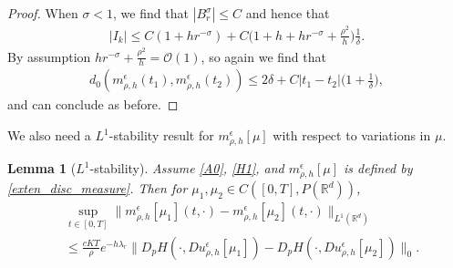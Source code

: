 \documentclass[a4paper,  twoside, 10pt, leqno]{amsart}
\newcommand{\R}{\mathbb{R}}
\newcommand{\rd}{\mathbb{R}^d}
\newtheorem{lemma}[thm]{Lemma}
\theoremstyle{remark}
\theoremstyle{definition}
\begin{document}
\begin{proof}
When $\sigma<1$, we find that $|B_r^{\sigma}|\leq C$ and hence that
\begin{align*} 
|I_k| \leq  C(1+h r ^{-\sigma} )  + C\big( 1 + h   +h r ^{-\sigma} + \frac{\rho^2}{h}\big) \frac{1}{\delta}.
\end{align*}
By assumption $h r^{-\sigma}+ \frac{\rho^2}{h}= \mathcal{O}(1)$, so again we find that
\begin{align*}
d_0(m^{\epsilon}_{\rho,h}(t_1),m^{\epsilon}_{\rho,h}(t_2)) \leq 2\delta + C |t_1-t_2|\Big(1+\frac{1}{\delta}\Big), 
\end{align*}
and can conclude as before.
\end{proof} 

We also need a $L^1$-stability result for $m^{\epsilon}_{\rho,h}[\mu]$ with respect to variations in $\mu$.

\begin{lemma}[$L^{1}$-stability] \label{L1_stability_fp}
Assume \ref{A0}, \ref{H1}, and $m^{\epsilon}_{\rho,h}[\mu]$ is defined by \eqref{exten_disc_measure}.
    Then for $\mu_1,\mu_2 \in C([0,T],P(\rd))$,
    \begin{align*}
      &  \sup_{t \in  [ 0,T ]} \| m^{\epsilon}_{\rho,h}[\mu_1] ( t, \cdot ) - m^{\epsilon}_{\rho,h}[\mu_2] ( t,\cdot )   \|_{L^{1} ( \R^d )}  \\
        &\leq \frac{cKT}{\rho} e^{- h \lambda_{r}} \big\| D_p H(\cdot, Du^{\epsilon}_{\rho,h}[\mu_1]) - D_p H(\cdot, Du^{\epsilon}_{\rho,h}[\mu_2])  \big\|_{0} .
    \end{align*}
\end{lemma}
\end{document}
